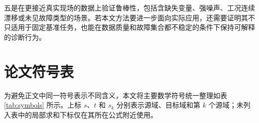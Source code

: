 \documentclass{seuthesis-2022}
\begin{document}
五是在更接近真实现场的数据上验证鲁棒性，包括含缺失变量、强噪声、工况连续漂移或未见故障类型的场景。若本文方法要进一步面向实际应用，还需要证明其不只适用于固定基准任务，也能在数据质量和故障集合都不稳定的条件下保持可解释的诊断行为。

\cleardoublepage


\clearpage
\appendix
\renewcommand{\thetable}{\Alph{chapter}.\arabic{table}}
\chapter{论文符号表}

为避免正文中同一符号表示不同含义，本文将主要数学符号统一整理如表 \ref{tab:symbols} 所示。上标 $s$、$t$ 和 $s_k$ 分别表示源域、目标域和第 $k$ 个源域；未列入表中的局部求和下标仅在其所在公式附近使用。
\end{document}
